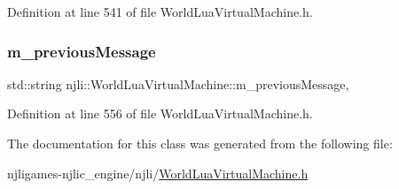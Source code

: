 Definition at line 541 of file World\+Lua\+Virtual\+Machine.\+h.

\mbox{\label{classnjli_1_1_world_lua_virtual_machine_ac786f57d118424a273a1e04f9a0d6c53}} 
\subsubsection{\texorpdfstring{m\+\_\+previous\+Message}{m\_previousMessage}}
{\footnotesize\ttfamily std\+::string njli\+::\+World\+Lua\+Virtual\+Machine\+::m\+\_\+previous\+Message\hspace{0.3cm}{\ttfamily [static]}, {\ttfamily [private]}}



Definition at line 556 of file World\+Lua\+Virtual\+Machine.\+h.



The documentation for this class was generated from the following file\+:\begin{DoxyCompactItemize}
\item 
njligames-\/njlic\+\_\+engine/njli/\mbox{\hyperlink{_world_lua_virtual_machine_8h}{World\+Lua\+Virtual\+Machine.\+h}}\end{DoxyCompactItemize}

